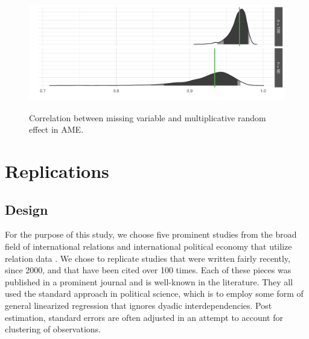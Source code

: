 \documentclass[12pt]{amsart}
\begin{document}
\begin{figure}
	\centering
	\caption{Correlation between missing variable and multiplicative random effect in AME.}
	\label{fig:ameCorr}
	\includegraphics[width=1\textwidth]{ameSimCorr.pdf} \\
\end{figure}

\section{Replications}
 
\subsection{Design}

For the purpose of this study, we choose five prominent studies from the broad field of international relations and international political economy that utilize relation data \citep{mcdonald:2004, reiter:stam:2003, rose:2004, weeks:2012, gibler:2017}. We chose to replicate studies that were written fairly recently, since 2000, and that have been cited over 100 times. Each of these pieces was published in a prominent journal and is well-known in the literature. They all used the standard approach in political science, which is to employ some form of general linearized regression that ignores dyadic interdependencies. Post estimation, standard errors are often adjusted in an attempt to account for clustering of observations.

\begin{table}
\caption{Features of the Studies Replicated. }
\end{table}
\end{document}
